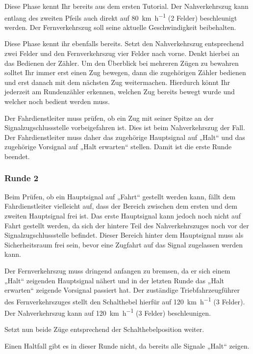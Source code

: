    Diese Phase kennt Ihr bereits aus dem ersten Tutorial. Der Nahverkehrszug kann entlang des zweiten Pfeils auch direkt auf \SI{80}{\kilo\metre\per\hour} (2 Felder) beschleunigt werden. Der Fernverkehrszug soll seine aktuelle Geschwindigkeit beibehalten.

   Diese Phase kennt ihr ebenfalls bereits. Setzt den Nahverkehrszug entsprechend zwei Felder und den Fernverkehrszug vier Felder nach vorne. Denkt hierbei an das Bedienen der Zähler. Um den Überblick bei mehreren Zügen zu bewahren solltet Ihr immer erst einen Zug bewegen, dann die zugehörigen Zähler bedienen und erst danach mit dem nächsten Zug weitermachen. Hierdurch könnt Ihr jederzeit am Rundenzähler erkennen, welchen Zug bereits bewegt wurde und welcher noch bedient werden muss.

   Der Fahrdienstleiter muss prüfen, ob ein Zug mit seiner Spitze an der Signalzugschlussstelle vorbeigefahren ist. Dies ist beim Nahverkehrszug der Fall. Der Fahrdienstleiter muss daher das zugehörige Hauptsignal auf „Halt“ und das zugehörige Vorsignal auf „Halt erwarten“ stellen. Damit ist die erste Runde beendet.


\subsubsection*{Runde 2}
   Beim Prüfen, ob ein Hauptsignal auf „Fahrt“ gestellt werden kann, fällt dem Fahrdienstleiter vielleicht auf, dass der Bereich zwischen dem ersten und dem zweiten Hauptsignal frei ist. Das erste Hauptsignal kann jedoch noch nicht auf Fahrt gestellt werden, da sich der hintere Teil des Nahverkehrszuges noch vor der Signalzugschlussstelle befindet. Dieser Bereich hinter dem Hauptsignal muss als Sicherheitsraum frei sein, bevor eine Zugfahrt auf das Signal zugelassen werden kann.
  
   Der Fernverkehrszug muss dringend anfangen zu bremsen, da er sich einem „Halt“ zeigenden Hauptsignal nähert und in der letzten Runde das „Halt erwarten“ zeigende Vorsignal passiert hat. Der zuständige Triebfahrzeugführer des Fernverkehrszuges stellt den Schalthebel hierfür auf \SI{120}{\kilo\metre\per\hour} (3 Felder). Der Nahverkehrszug kann auf \SI{120}{\kilo\metre\per\hour} (3 Felder) beschleunigen.

   Setzt nun beide Züge entsprechend der Schalthebelposition weiter.

   Einen Haltfall gibt es in dieser Runde nicht, da bereits alle Signale „Halt“ zeigen.



